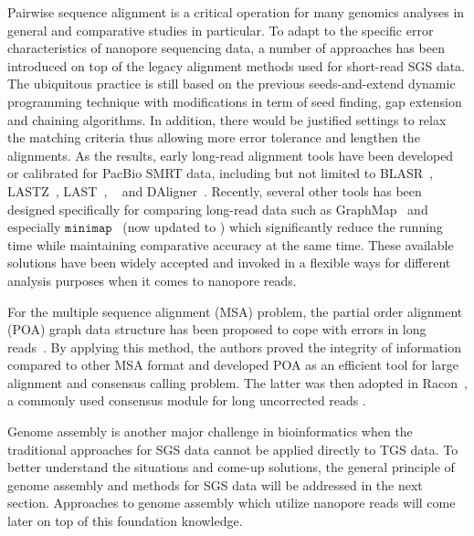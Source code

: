 Pairwise sequence alignment is a critical operation for many genomics analyses in general and  comparative studies in particular. To adapt to the specific error characteristics of nanopore sequencing data, a number of approaches has been introduced on top of the legacy alignment methods used for short-read SGS data. 
The ubiquitous practice is still based on the previous seeds-and-extend dynamic programming technique with modifications in term of seed finding, gap extension and chaining algorithms. In addition, there would be justified settings to relax the matching criteria thus allowing more error tolerance and lengthen the alignments. As the results, early long-read alignment tools have been developed or calibrated for PacBio SMRT data, including but not limited to BLASR~\cite{ChaissonT2012}, LASTZ~\cite{Harris2007lastz}, LAST~\cite{KiełbasaWSH2011}, \bwa{}~\cite{Li2013} and DAligner~\cite{Meyer2014daligner}.
Recently, several other tools has been designed specifically for comparing long-read data such as GraphMap~\cite{Sovic2016graphmap} and especially $\mathtt{minimap}$~\cite{Li2016} (now updated to \minimap{}) which significantly reduce the running time while maintaining comparative accuracy at the same time. These available solutions have been widely accepted and invoked in a flexible ways for different analysis purposes when it comes to nanopore reads.

For the multiple sequence alignment (MSA) problem, the partial order alignment (POA) graph data structure has been proposed to cope with errors in long reads~\cite{Lee2002multiple,Lee2003generating,Grasso2004combining}. By applying this method, the authors proved the integrity of information compared to other MSA format and developed POA as an efficient tool for large alignment and consensus calling problem. The latter was then adopted in Racon~\cite{Vaser2017racon}, a commonly used 
consensus module for long uncorrected reads .

Genome assembly is another major challenge in bioinformatics when the traditional approaches for SGS data cannot be applied directly to TGS data.
To better understand the situations and come-up solutions, the general principle of genome assembly and methods for SGS data will be addressed in the next section.
Approaches to genome assembly which utilize nanopore reads will come later on top of this foundation knowledge. 

